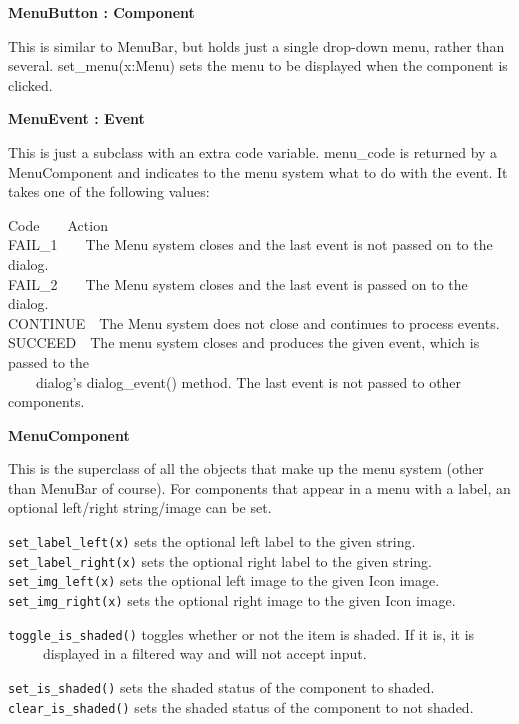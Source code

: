 {\ttfamily\bfseries
{}MenuButton : Component}

This is similar to MenuBar, but holds just a single drop-down menu,
rather than several. set\_menu(x:Menu) sets the menu to be displayed
when the component is clicked.

{\ttfamily\bfseries
{}MenuEvent : Event}

This is just a subclass with an extra code variable. menu\_code is
returned by a MenuComponent and indicates to the menu system what to do
with the event. It takes one of the following values:

Code\ \ \ \ Action\\
FAIL\_1\ \ \ \ The Menu system closes and the last event is not passed
on to the dialog.\\
FAIL\_2\ \ \ \ The Menu system closes and the last event is passed on to
the dialog.\\
CONTINUE\ \ The Menu system does not close and continues to process
events.\\
SUCCEED\ \ The menu system closes and produces the given event, which is
passed to the\\
 \ \ \ \ dialog's dialog\_event() method. The last
event is not passed to other components.

{\ttfamily\bfseries
{}MenuComponent}

This is the superclass of all the objects that make up the menu system
(other than MenuBar of course). For components that appear in a menu
with a label, an optional left/right string/image can be set.

\texttt{set\_label\_left(x)} sets the optional left label to the given
string.\\
\texttt{set\_label\_right(x)} sets the optional right label to the given
string.\\
\texttt{set\_img\_left(x)} sets the optional left image to the given Icon
image.\\
\texttt{set\_img\_right(x)} sets the optional right image to the given Icon
image.

\texttt{toggle\_is\_shaded()} toggles whether or not the item is shaded. If it
is, it is\\
 \ \ \ \ \ displayed in a filtered way and will not accept input.

\texttt{set\_is\_shaded()} sets the shaded status of the component to
shaded.\\
\texttt{clear\_is\_shaded()} sets the shaded status of the component to not
shaded.

